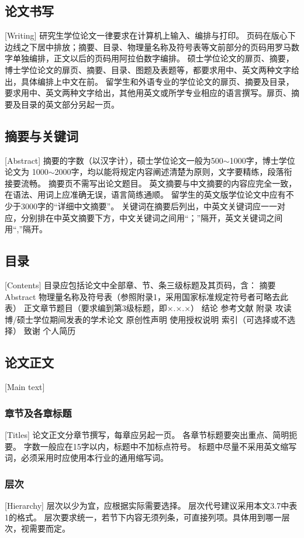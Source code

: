 \subsection{论文书写}[Writing]
研究生学位论文一律要求在计算机上输入、编排与打印。
页码在版心下边线之下居中排放；摘要、目录、物理量名称及符号表等文前部分的页码用罗马数字单独编排，正文以后的页码用阿拉伯数字编排。
硕士学位论文的扉页、摘要，博士学位论文的扉页、摘要、目录、图题及表题等，都要求用中、英文两种文字给出，具体编排上中文在前。
留学生和外语专业的学位论文的扉页、摘要及目录，要求用中、英文两种文字给出，其他用英文或所学专业相应的语言撰写。扉页、摘要及目录的英文部分另起一页。

\subsection{摘要与关键词}[Abstract]
摘要的字数（以汉字计），硕士学位论文一般为500$\sim$\num{1000}字，博士学位论文为
\num{1000}$\sim$\num{2000}字，均以能将规定内容阐述清楚为原则，文字要精练，段落衔
接要流畅。
摘要页不需写出论文题目。
英文摘要与中文摘要的内容应完全一致，在语法、用词上应准确无误，语言简练通顺。
留学生的英文版学位论文中应有不少于\num{3000}字的“详细中文摘要”。
关键词在摘要后列出，中英文关键词应一一对应，分别排在中英文摘要下方，中文关键词之间用“；”隔开，英文关键词之间用“,”隔开。

\subsection{目录}[Contents]
目录应包括论文中全部章、节、条三级标题及其页码，含：
摘要
Abstract
物理量名称及符号表（参照附录1，采用国家标准规定符号者可略去此表）
正文章节题目（要求编到第3级标题，即×.×.×）
结论
参考文献
附录
攻读博/硕士学位期间发表的学术论文
原创性声明
使用授权说明
索引（可选择或不选择）
致谢
个人简历

\subsection{论文正文}[Main text]
\subsubsection{章节及各章标题}[Titles]
论文正文分章节撰写，每章应另起一页。
各章节标题要突出重点、简明扼要。
字数一般应在15字以内，标题中不加标点符号。
标题中尽量不采用英文缩写词，必须采用时应使用本行业的通用缩写词。
\subsubsection{层次}[Hierarchy]
层次以少为宜，应根据实际需要选择。
层次代号建议采用本文3.7中表1的格式。
层次要求统一，若节下内容无须列条，可直接列项。具体用到哪一层次，视需要而定。
